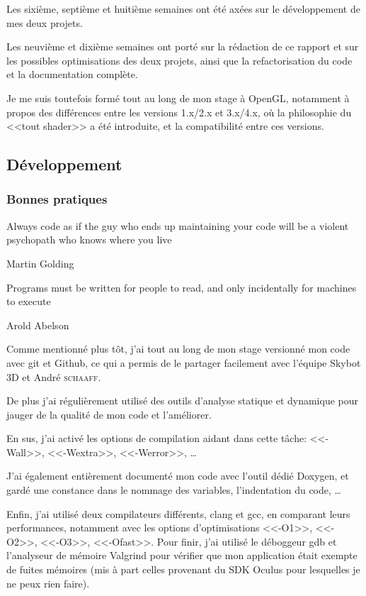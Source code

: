 \documentclass[a4paper,french,12pt]{article}
\begin{document}
		Les sixième, septième et huitième semaines ont été axées sur le développement de mes deux projets.

		Les neuvième et dixième semaines ont porté sur la rédaction de ce rapport et sur les possibles optimisations
		des deux projets, ainsi que la refactorisation du code et la documentation complète.

		Je me suis toutefois formé tout au long de mon stage à OpenGL, notamment à propos
		des différences entre les versions 1.x/2.x et 3.x/4.x, où la philosophie du <<tout shader>> a été introduite,
		et la compatibilité entre ces versions.



	\subsection{Développement}

	  \subsubsection{Bonnes pratiques}
	    \epigraph{Always code as if the guy who ends up maintaining your code will be a violent psychopath who knows where you live}{Martin Golding}
	    \epigraph{Programs must be written for people to read, and only incidentally for machines to execute}{Arold Abelson}

	    Comme mentionné plus tôt, j'ai tout au long de mon stage versionné mon code avec git et Github, ce qui a
	    permis de le partager facilement avec l'équipe Skybot 3D et André \textsc{schaaff}.

	    De plus j'ai régulièrement utilisé des outils d'analyse statique et dynamique pour jauger de la qualité de
	    mon code et l'améliorer.

	    En sus, j'ai activé les options de compilation aidant dans cette tâche: <<-Wall>>, <<-Wextra>>, <<-Werror>>, \ldots



	    J'ai également entièrement documenté mon code avec l'outil dédié Doxygen, et gardé une constance dans le nommage des variables,
	    l'indentation du code, \ldots

	    Enfin, j'ai utilisé deux compilateurs différents, clang et gcc, en comparant leurs performances,
	    notamment avec les options d'optimisations <<-O1>>, <<-O2>>, <<-O3>>, <<-Ofast>>.
	    Pour finir, j'ai utilisé le déboggeur gdb et l'analyseur de mémoire Valgrind pour vérifier que mon application
	    était exempte de fuites mémoires (mis à part celles provenant du SDK Oculus pour lesquelles je ne peux rien faire).
\end{document}
